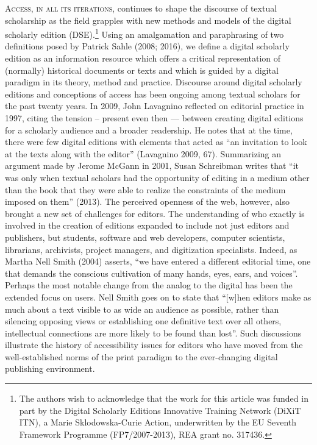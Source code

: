 \begin{paper}
\textsc{Access, in all its iterations}, continues to shape the discourse of
textual scholarship as the field grapples with new methods and models of
the digital scholarly edition (DSE).\footnote{The authors wish to
  acknowledge that the work for this article was funded in part by the
  Digital Scholarly Editions Innovative Training Network (DiXiT ITN), a
  Marie Sklodowska-Curie Action, underwritten by the EU Seventh
  Framework Programme (FP7/2007-2013), REA grant no. 317436.} Using an
amalgamation and paraphrasing of two definitions posed by Patrick
Sahle (2008; 2016), we define a digital scholarly edition as an
information resource which offers a critical representation of
(normally) historical documents or texts and which is guided by a
digital paradigm in its theory, method and practice. Discourse around
digital scholarly editions and conceptions of access has been ongoing
among textual scholars for the past twenty years. In 2009, John
Lavagnino reflected on editorial practice in 1997, citing the tension --
present even then --- between creating digital editions for a scholarly
audience and a broader readership. He notes that at the time, there were
few digital editions with elements that acted as ``an invitation to look
at the texts along with the editor'' (Lavagnino 2009, 67). Summarizing
an argument made by Jerome McGann in 2001, Susan Schreibman writes that
``it was only when textual scholars had the opportunity of editing in a
medium other than the book that they were able to realize the
constraints of the medium imposed on them'' (2013). The perceived
openness of the web, however, also brought a new set of challenges for
editors. The understanding of who exactly is involved in the creation of
editions expanded to include not just editors and publishers, but
students, software and web developers, computer scientists, librarians,
archivists, project managers, and digitization specialists. Indeed, as
Martha Nell Smith (2004) asserts, ``we have entered a different
editorial time, one that demands the conscious cultivation of many
hands, eyes, ears, and voices''. Perhaps the most notable change from
the analog to the digital has been the extended focus on users. Nell
Smith goes on to state that ``{[}w{]}hen editors make as much about a
text visible to as wide an audience as possible, rather than silencing
opposing views or establishing one definitive text over all others,
intellectual connections are more likely to be found than lost''. Such
discussions illustrate the history of accessibility issues for editors
who have moved from the well-established norms of the print paradigm to
the ever-changing digital publishing environment.


\end{paper}
